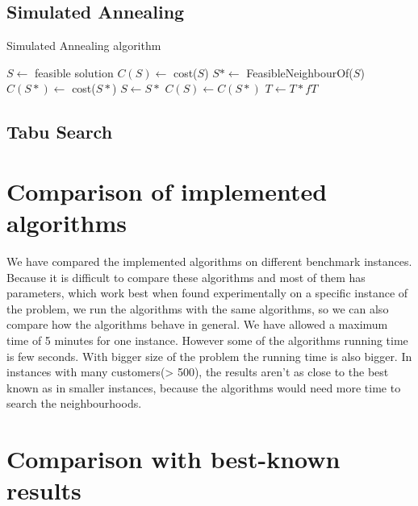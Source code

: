 \documentclass[thesis=B,english]{FITthesis}[2012/10/20]
\begin{document}
        \subsection{Simulated Annealing}
\begin{algorithm}
\caption{Simulated Annealing algorithm}\label{SA}
\begin{algorithmic}[1]
\State $S \gets$ feasible solution
\State $C(S) \gets$ cost($S$)
    \State $S* \gets$ FeasibleNeighbourOf($S$)
    \State $C(S*) \gets$ cost($S*$)
        \State $S \gets S*$
        \State $C(S) \gets C(S*)$
    \EndIf
    \State $T \gets T * fT$
\EndWhile
\EndProcedure
\end{algorithmic}
\end{algorithm}
\newpage
        \subsection{Tabu Search}

\newpage
    \section{Comparison of implemented algorithms}
        We have compared the implemented algorithms on different benchmark instances. Because it is difficult to compare these algorithms and most of them has parameters, which work best when found experimentally on a specific instance of the problem, we run the algorithms with the same algorithms, so we can also compare how the algorithms behave in general.
        We have allowed a maximum time of 5 minutes for one instance. However some of the algorithms running time is few seconds. With bigger size of the problem the running time is also bigger.
        In instances with many customers(> 500), the results aren't as close to the best known as in smaller instances, because the algorithms would need more time to search the neighbourhoods.
    \section{Comparison with best-known results}
\end{document}
